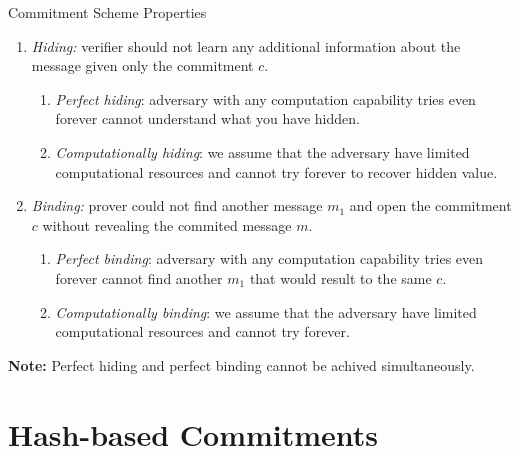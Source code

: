 \documentclass{zkdl-presentation-template}
\begin{document}
    \begin{frame}{Commitment Scheme Properties}
        \begin{definition}
            \begin{enumerate}
                \item \textit{Hiding: } verifier should not learn any additional information about the message given only the commitment $c$.
                \begin{enumerate}
                    \item \textit{Perfect hiding}: adversary with any computation capability tries even forever cannot understand what you have hidden.
                    \item \textit{Computationally hiding}: we assume that the adversary have limited computational resources and cannot try forever to recover hidden value.
                \end{enumerate}
                
                \item \textit{Binding: } prover could not find another message $m_1$ and open the commitment $c$ without revealing the commited message $m$.
                \begin{enumerate}
                    \item \textit{Perfect binding}: adversary with any computation capability tries even forever cannot find another $m_1$ that would result to the same $c$.
                    \item \textit{Computationally binding}: we assume that the adversary have limited computational resources and cannot try forever.
                \end{enumerate}
            \end{enumerate}
        \end{definition}
        \vspace{-12.5pt}

        \textbf{Note:} Perfect hiding and perfect binding cannot be achived simultaneously.
    \end{frame}

    \section{Hash-based Commitments}
\end{document}
